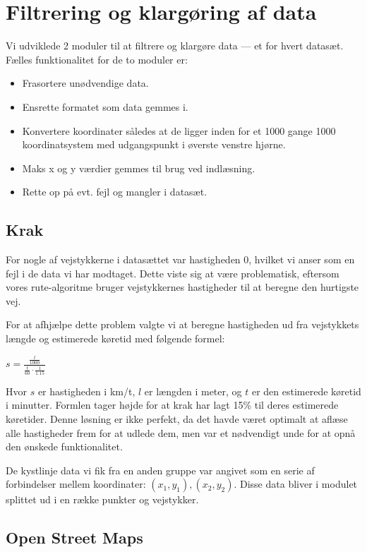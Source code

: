 \section{Filtrering og klargøring af data}
\label{sec:filtreringOgKlargoeringAfData}

Vi udviklede 2 moduler til at filtrere og klargøre data --- et for hvert datasæt. Fælles funktionalitet for de to moduler er:

\begin{itemize}
	\item Frasortere unødvendige data.
	\item Ensrette formatet som data gemmes i.
	\item Konvertere koordinater således at de ligger inden for et 1000 gange 1000 koordinatsystem med udgangspunkt i øverste venstre hjørne.
	\item Maks x og y værdier gemmes til brug ved indlæsning.
	\item Rette op på evt. fejl og mangler i datasæt.
\end{itemize}

\subsection{Krak}
\label{sec:krak}

For nogle af vejstykkerne i datasættet var hastigheden 0, hvilket vi anser som en fejl i de data vi har modtaget. Dette viste sig at være problematisk, eftersom vores rute-algoritme bruger vejstykkernes hastigheder til at beregne den hurtigste vej.

For at afhjælpe dette problem valgte vi at beregne hastigheden ud fra vejstykkets længde og estimerede køretid med følgende formel:

\vspace{1ex}
$s = \frac{\frac{l}{1000}}{\frac{t}{60} \cdot \frac{1}{1.15}}$
\vspace{1ex}

Hvor $s$ er hastigheden i km/t, $l$ er længden i meter, og $t$ er den estimerede køretid i minutter. Formlen tager højde for at krak har lagt 15\% til deres estimerede køretider. Denne løsning er ikke perfekt, da det havde været optimalt at aflæse alle hastigheder frem for at udlede dem, men var et nødvendigt unde for at opnå den ønskede funktionalitet.

De kystlinje data vi fik fra en anden gruppe var angivet som en serie af forbindelser mellem koordinater: $(x_1, y_1), (x_2, y_2)$. Disse data bliver i modulet splittet ud i en række punkter og vejstykker.

\subsection{Open Street Maps}
\label{sec:openStreetMaps}
